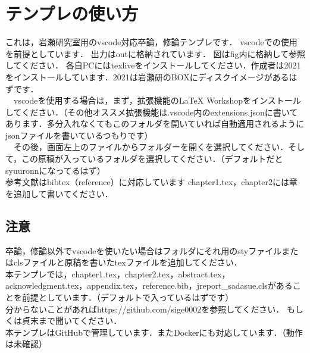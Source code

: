 \chapter{テンプレの使い方}
これは，岩瀬研究室用のvscode対応卒論，修論テンプレです．
vscodeでの使用を前提としています．
出力はoutに格納されています．
図はfig内に格納して参照してください．
各自PCにはtexliveをインストールしてください．作成者は2021をインストールしています．2021は岩瀬研のBOXにディスクイメージがあるはずです．\\
　vscodeを使用する場合は，まず，拡張機能のLaTeX Workshopをインストールしてください．（その他オススメ拡張機能は.vscode内のextensions.jsonに書いてあります．多分入れなくてもこのフォルダを開いていれば自動適用されるようにjsonファイルを書いているつもりです）\\
　その後，画面左上のファイルからフォルダーを開くを選択してください．そして，この原稿が入っているフォルダを選択してください．（デフォルトだとsyuuronnになってるはず）\\
参考文献はbibtex（reference）に対応しています\cite{1}
chapter1.tex，chapter2には章を追加して書いてください．
\section{注意}
卒論，修論以外でvscodeを使いたい場合はフォルダにそれ用のstyファイルまたはclsファイルと原稿を書いたtexファイルを追加してください．\\
本テンプレでは，chapter1.tex，chapter2.tex，abstract.tex，acknowledgment.tex，appendix.tex，reference.bib，jreport\_sadasue.clsがあることを前提としています．（デフォルトで入っているはずです）\\
分からないことがあればhttps://github.com/sige0002を参照してください．
もしくは貞末まで聞いてください．\\
本テンプレはGitHubで管理しています．またDockerにも対応しています．（動作は未確認）




